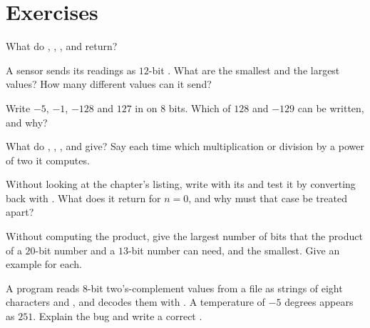 \section{Exercises}\label{sec:g10:machine-integers:exercises}

\begin{exercise}[$\star$]\label{exo:g10:machine-integers:1}
What do , , ,  and  return?
\end{exercise}

\begin{exercise}[$\star$]\label{exo:g10:machine-integers:2}
A sensor sends its readings as $12$-bit . What are the smallest and the largest values? How many
different values can it send?
\end{exercise}

\begin{exercise}[$\star$]\label{exo:g10:machine-integers:3}
Write $-5$, $-1$, $-128$ and $127$ in  on $8$ bits. Which of $128$ and $-129$ can be written, and why?
\end{exercise}

\begin{exercise}[$\star$]\label{exo:g10:machine-integers:4}
What do , , ,  and  give? Say each time which
multiplication or division by a power of two it computes.
\end{exercise}

\begin{exercise}[$\star$]\label{exo:g10:machine-integers:5}
Without looking at the chapter's listing, write  with its  and test it by converting
back with . What does it return for $n = 0$, and why must that case be treated apart?
\end{exercise}

\begin{exercise}[$\star\star$]\label{exo:g10:machine-integers:6}
Without computing the product, give the largest number of bits that the product of a $20$-bit number and a $13$-bit
number can need, and the smallest. Give an example for each.
\end{exercise}

\begin{exercise}[$\star\star$]\label{exo:g10:machine-integers:7}
A program reads 8-bit two's-complement values from a file as strings of eight characters  and , and
decodes them with . A temperature of $-5$ degrees appears as $251$. Explain the bug and write a
correct .
\end{exercise}

